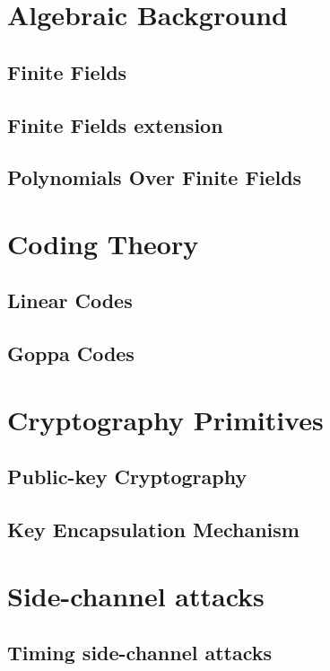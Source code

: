 \section{Algebraic Background}
\subsection{Finite Fields}
\subsection{Finite Fields extension}
\subsection{Polynomials Over Finite Fields}
\section{Coding Theory}
\subsection{Linear Codes}
\subsection{Goppa Codes}
\section{Cryptography Primitives}
\subsection{Public-key Cryptography}
\subsection{Key Encapsulation Mechanism}
\section{Side-channel attacks}
\subsection{Timing side-channel attacks}
